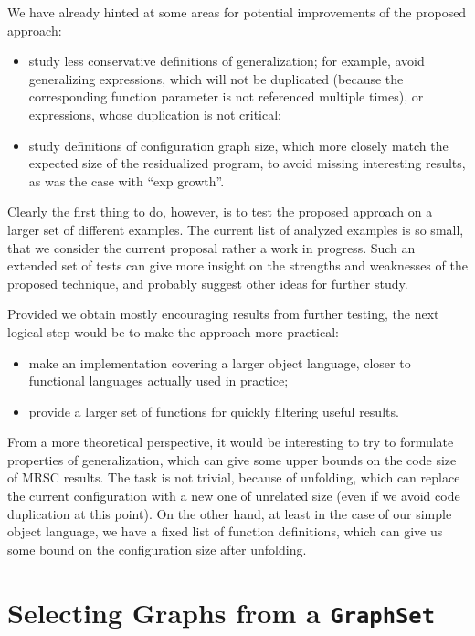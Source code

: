 \documentclass[submission,copyright,creativecommons]{eptcs}
\begin{document}
We have already hinted at some areas for potential improvements of the proposed approach:
\begin{itemize}
  \item study less conservative definitions of generalization; for example, avoid generalizing
    expressions, which will not be duplicated (because the corresponding function parameter is
    not referenced multiple times), or expressions, whose duplication is not critical;
  \item study definitions of configuration graph size, which more closely match the expected
    size of the residualized program, to avoid missing interesting results, as was the case
    with ``exp growth''.
\end{itemize}
Clearly the first thing to do, however, is to test the proposed approach on a larger set of
different examples.
The current list of analyzed examples is so small, that we consider the current proposal
rather a work in progress.
Such an extended set of tests can give more insight on the strengths and weaknesses of the
proposed technique, and probably suggest other ideas for further study.

Provided we obtain mostly encouraging results from further testing, the next logical 
step would be to make the approach more practical:
\begin{itemize}
  \item make an implementation covering a larger object language, closer to functional languages
    actually used in practice;
  \item provide a larger set of functions for quickly filtering useful results.
\end{itemize}

From a more theoretical perspective, it would be interesting to try to formulate properties
of generalization, which can give some upper bounds on the code size of MRSC results.
The task is not trivial, because of unfolding, which can replace the current configuration
with a new one of unrelated size (even if we avoid code duplication at this point).
On the other hand, at least in the case of our simple object language, we have a fixed
list of function definitions, which can give us some bound on the configuration size
after unfolding.




\appendix

\clearpage
\section{Selecting Graphs from a \texttt{GraphSet}}\label{app:FilterGraphSet}
\end{document}
